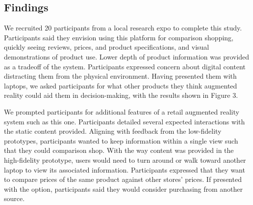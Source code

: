 \subsection{Findings}
We recruited 20 participants from a local research expo to complete this study. Participants said they envision using this platform for comparison shopping, quickly seeing reviews, prices, and product specifications, and visual demonstrations of product use. Lower depth of product information was provided as a tradeoff of the system. Participants expressed concern about digital content distracting them from the physical environment. Having presented them with laptops, we asked participants for what other products they think augmented reality could aid them in decision-making, with the results shown in Figure 3. 

We prompted participants for additional features of a retail augmented reality system such as this one. Participants detailed several expected interactions with the static content provided. Aligning with feedback from the low-fidelity prototypes, participants wanted to keep information within a single view such that they could comparison shop. With the way content was provided in the high-fidelity prototype, users would need to turn around or walk toward another laptop to view its associated information. Participants expressed that they want to compare prices of the same product against other stores' prices. If presented with the option, participants said they would consider purchasing from another source.